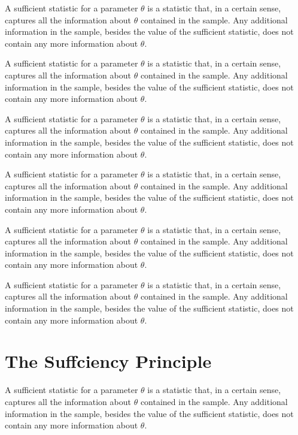 A sufficient statistic for a parameter $\theta$ is a statistic that, in a certain sense, captures all the information about $\theta$ contained in the sample. Any additional information in the sample, besides the value of the sufficient statistic, does not contain any more information about $\theta$.

A sufficient statistic for a parameter $\theta$ is a statistic that, in a certain sense, captures all the information about $\theta$ contained in the sample. Any additional information in the sample, besides the value of the sufficient statistic, does not contain any more information about $\theta$.

A sufficient statistic for a parameter $\theta$ is a statistic that, in a certain sense, captures all the information about $\theta$ contained in the sample. Any additional information in the sample, besides the value of the sufficient statistic, does not contain any more information about $\theta$.

A sufficient statistic for a parameter $\theta$ is a statistic that, in a certain sense, captures all the information about $\theta$ contained in the sample. Any additional information in the sample, besides the value of the sufficient statistic, does not contain any more information about $\theta$.

A sufficient statistic for a parameter $\theta$ is a statistic that, in a certain sense, captures all the information about $\theta$ contained in the sample. Any additional information in the sample, besides the value of the sufficient statistic, does not contain any more information about $\theta$.

A sufficient statistic for a parameter $\theta$ is a statistic that, in a certain sense, captures all the information about $\theta$ contained in the sample. Any additional information in the sample, besides the value of the sufficient statistic, does not contain any more information about $\theta$.

\section{The Suffciency Principle}

A sufficient statistic for a parameter $\theta$ is a statistic that, in a certain sense, captures all the information about $\theta$ contained in the sample. Any additional information in the sample, besides the value of the sufficient statistic, does not contain any more information about $\theta$.

